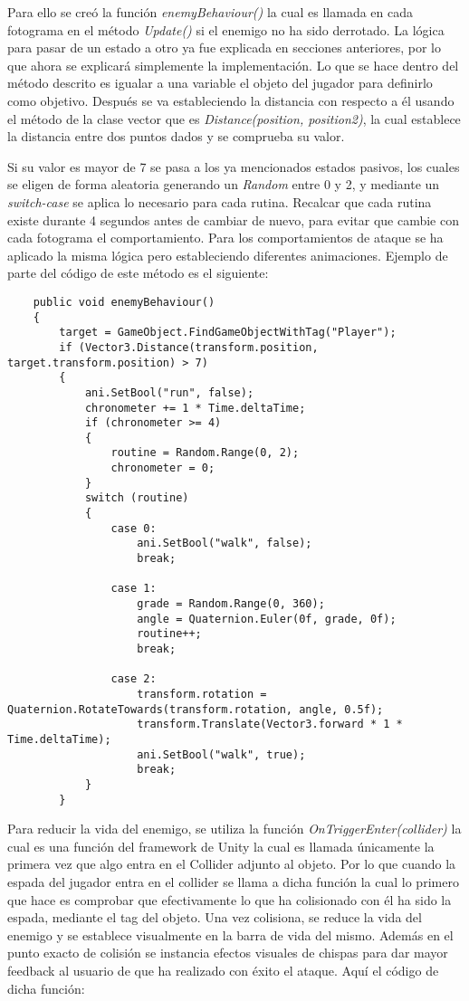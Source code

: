 Para ello se creó la función \textit{enemyBehaviour()} la cual es llamada en cada fotograma en el método \textit{Update()} si el enemigo no ha sido derrotado. La lógica para pasar de un estado a otro ya fue explicada en secciones anteriores, por lo que ahora se explicará simplemente la implementación. Lo que se hace dentro del método descrito es igualar a una variable el objeto del jugador para definirlo como objetivo. Después se va estableciendo la distancia con respecto a él usando el método de la clase vector que es \textit{Distance(position, position2)}, la cual establece la distancia entre dos puntos dados y se comprueba su valor. 

Si su valor es mayor de 7 se pasa a los ya mencionados estados pasivos, los cuales se eligen de forma aleatoria generando un \textit{Random} entre 0 y 2, y mediante un \textit{switch-case} se aplica lo necesario para cada rutina. Recalcar que cada rutina existe durante 4 segundos antes de cambiar de nuevo, para evitar que cambie con cada fotograma el comportamiento. Para los comportamientos de ataque se ha aplicado la misma lógica pero estableciendo diferentes animaciones. Ejemplo de parte del código de este método es el siguiente:

\begin{lstlisting}
    public void enemyBehaviour()
    {
        target = GameObject.FindGameObjectWithTag("Player");
        if (Vector3.Distance(transform.position, target.transform.position) > 7)
        {
            ani.SetBool("run", false);
            chronometer += 1 * Time.deltaTime;
            if (chronometer >= 4)
            {
                routine = Random.Range(0, 2);
                chronometer = 0;
            }
            switch (routine)
            {
                case 0:
                    ani.SetBool("walk", false);
                    break;

                case 1:
                    grade = Random.Range(0, 360);
                    angle = Quaternion.Euler(0f, grade, 0f);
                    routine++;
                    break;

                case 2:
                    transform.rotation = Quaternion.RotateTowards(transform.rotation, angle, 0.5f);
                    transform.Translate(Vector3.forward * 1 * Time.deltaTime);
                    ani.SetBool("walk", true);
                    break;
            }
        }
\end{lstlisting}

Para reducir la vida del enemigo, se utiliza la función \textit{OnTriggerEnter(collider)} la cual es una función del framework de Unity la cual es llamada únicamente la primera vez que algo entra en el Collider adjunto al objeto. Por lo que cuando la espada del jugador entra en el collider se llama a dicha función la cual lo primero que hace es comprobar que efectivamente lo que ha colisionado con él ha sido la espada, mediante el tag del objeto. Una vez colisiona, se reduce la vida del enemigo y se establece visualmente en la barra de vida del mismo. Además en el punto exacto de colisión se instancia efectos visuales de chispas para dar mayor feedback al usuario de que ha realizado con éxito el ataque. Aquí el código de dicha función: 

